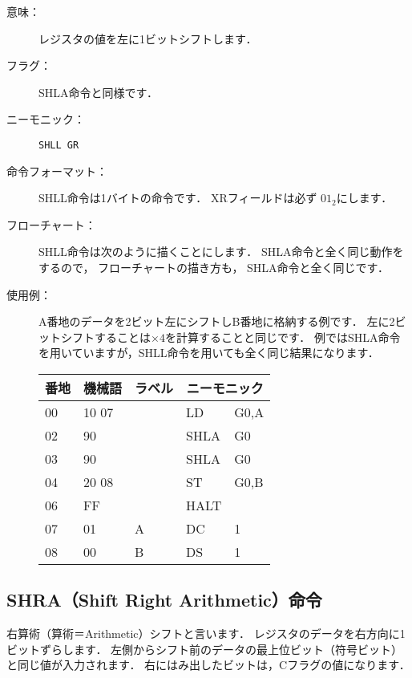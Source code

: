 \begin{description}
\item[意味：]レジスタの値を左に1ビットシフトします．

\item[フラグ：]
SHLA命令と同様です．

\item[ニーモニック：]{\tt SHLL  GR}

\item[命令フォーマット：]SHLL命令は1バイトの命令です．
XRフィールドは必ず $01_2$にします．


\item[フローチャート：]SHLL命令は次のように描くことにします．
SHLA命令と全く同じ動作をするので，
フローチャートの描き方も，
SHLA命令と全く同じです．

\begin{center}
\end{center}

\item[使用例：]
A番地のデータを2ビット左にシフトしB番地に格納する例です．
左に2ビットシフトすることは$\times 4$を計算することと同じです．
例ではSHLA命令を用いていますが，SHLL命令を用いても全く同じ結果になります．

{\tt\begin{center}
\begin{tabular}{|l|l|l|l l|} \hline
番地 & 機械語 & ラベル & \multicolumn{2}{|c|}{ニーモニック} \\
\hline
00 & 10 07 &   & LD   & G0,A \\
02 & 90    &   & SHLA & G0   \\
03 & 90    &   & SHLA & G0   \\
04 & 20 08 &   & ST   & G0,B \\
06 & FF    &   & HALT &      \\
07 & 01    & A & DC   & 1    \\
08 & 00    & B & DS   & 1    \\
\hline
\end{tabular}
\end{center}}

\end{description}

\newpage
\subsection{SHRA（Shift Right Arithmetic）命令}
右算術（算術＝Arithmetic）シフトと言います．
レジスタのデータを右方向に1ビットずらします．
左側からシフト前のデータの最上位ビット（符号ビット）と同じ値が入力されます．
右にはみ出したビットは，Cフラグの値になります．

